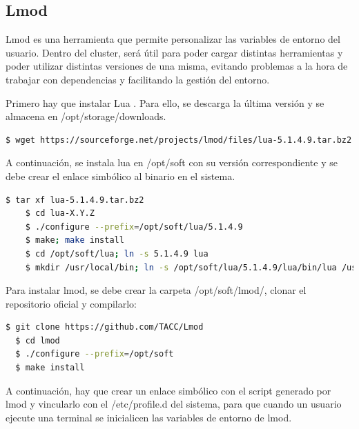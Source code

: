 \subsection{Lmod}
\vspace{2mm}

Lmod \cite{lmod} es una herramienta que permite personalizar las variables de entorno del usuario. Dentro del cluster, será útil para poder cargar distintas herramientas y poder utilizar distintas versiones de una misma, evitando problemas a la hora de trabajar con dependencias y facilitando la gestión del entorno.
\vspace{4mm}

Primero hay que instalar Lua \cite{lmod}. Para ello, se descarga la última versión y se almacena en /opt/storage/downloads.

\vspace{2mm}
\begin{lstlisting}[language=bash]
  $ wget https://sourceforge.net/projects/lmod/files/lua-5.1.4.9.tar.bz2
\end{lstlisting}
\vspace{2mm}

A continuación, se instala lua en /opt/soft con su versión correspondiente y se debe crear el enlace simbólico al binario en el sistema.
\vspace{2mm}

\begin{lstlisting}[language=bash]
    $ tar xf lua-5.1.4.9.tar.bz2
    $ cd lua-X.Y.Z
    $ ./configure --prefix=/opt/soft/lua/5.1.4.9
    $ make; make install
    $ cd /opt/soft/lua; ln -s 5.1.4.9 lua
    $ mkdir /usr/local/bin; ln -s /opt/soft/lua/5.1.4.9/lua/bin/lua /usr/local/bin
\end{lstlisting}
\vspace{2mm}

Para instalar lmod, se debe crear la carpeta /opt/soft/lmod/, clonar el repositorio oficial y compilarlo:

\vspace{2mm}
\begin{lstlisting}[language=bash]
  $ git clone https://github.com/TACC/Lmod
  $ cd lmod
  $ ./configure --prefix=/opt/soft
  $ make install
\end{lstlisting}
\vspace{2mm}

A continuación, hay que crear un enlace simbólico con el script generado por lmod y vincularlo con el /etc/profile.d del sistema, para que cuando un usuario ejecute una terminal se inicialicen las variables de entorno de lmod.

